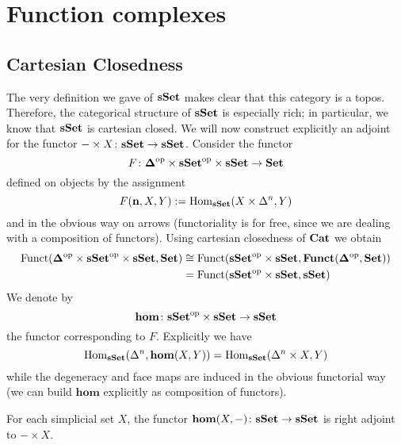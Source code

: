 \section{Function complexes}

\subsection{Cartesian Closedness}

The very definition we gave of $\mathbf{sSet}$ makes clear that this category is a topos. Therefore, the categorical structure of $\mathbf{sSet}$ is especially rich; in particular, we know that $\mathbf{sSet}$ is cartesian closed. We will now construct explicitly an adjoint for the functor $- \times X \colon \mathbf{sSet} \to \mathbf{sSet}$. Consider the functor
\[
F \colon \mathbf \Delta^{\mathrm{op}} \times \mathbf{sSet}^{\mathrm{op}} \times \mathbf{sSet} \to \mathbf{Set}
\]
defined on objects by the assignment
\[
F(\mathbf n, X,Y) := \mathrm{Hom}_{\mathbf{sSet}}(X \times \Delta^n, Y)
\]
and in the obvious way on arrows (functoriality is for free, since we are dealing with a composition of functors). Using cartesian closedness of $\mathbf{Cat}$ we obtain
\begin{align*}
\mathrm{Funct}(\mathbf \Delta^{\mathrm{op}} \times \mathbf{sSet}^{\mathrm{op}} \times \mathbf{sSet}, \mathbf{Set}) & \cong \mathrm{Funct}(\mathbf{sSet}^{\mathrm{op}} \times \mathbf{sSet}, \mathbf{Funct}(\mathbf{\Delta}^{\mathrm{op}}, \mathbf{Set})) \\
& = \mathrm{Funct}(\mathbf{sSet}^{\mathrm{op}} \times \mathbf{sSet}, \mathbf{sSet})
\end{align*}
We denote by
\[
\mathbf{hom} \colon \mathbf{sSet}^{\mathrm{op}} \times \mathbf{sSet} \to \mathbf{sSet}
\]
the functor corresponding to $F$. Explicitly we have
\[
\mathrm{Hom}_{\mathbf{sSet}}(\Delta^n, \mathbf{hom}(X,Y)) = \mathrm{Hom}_{\mathbf{sSet}}(\Delta^n \times X, Y)
\]
while the degeneracy and face maps are induced in the obvious functorial way (we can build $\mathbf{hom}$ explicitly as composition of functors).

\begin{prop} \label{prop sset cartesian closed}
For each simplicial set $X$, the functor $\mathbf{hom}(X,-) \colon \mathbf{sSet} \to \mathbf{sSet}$ is right adjoint to $- \times X$.
\end{prop}

